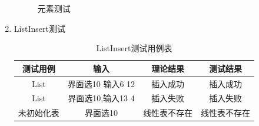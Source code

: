 \documentclass[supercite]{HustGraduPaper}
\theoremstyle{definition}
\begin{document}
\begin{enumerate}
\begin{figure}[htb]
		      \caption{元素测试}
	      \end{figure}
	      \newpage
	\item ListInsert测试
	      \begin{table}[htb]
		      \begin{center}
			      \setlength{\tabcolsep}{2.0mm}
			      \caption{ListInsert测试用例表}
			      \label{table9}
			      \begin{tabular}{|c|c|c|c|}
				      \hline
				      测试用例   & 输入              & 理论结果     & 测试结果     \\
				      \hline
				      \hline
				      List       & 界面选10 输入6 12 & 插入成功     & 插入成功     \\
				      \hline
				      List       & 界面选10,输入13 4 & 插入失败     & 插入失败     \\
				      \hline
				      未初始化表 & 界面选10          & 线性表不存在 & 线性表不存在 \\
				      \hline
			      \end{tabular}
		      \end{center}
	      \end{table}
	      \begin{figure}[htb]
		      \centering
		      \quad
		      \\

\end{figure}
\end{enumerate}
\end{document}
